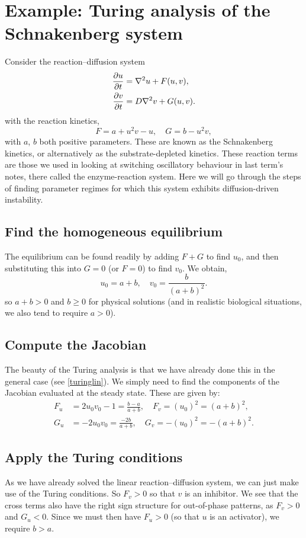 \documentclass[main.tex]{subfiles}
\begin{document}
\section{Example: Turing analysis of the Schnakenberg system}\label{Schnack_Sect}
Consider the reaction--diffusion system
    \begin{align}\label{RD_System_Schnack}
\pd{u}{t} &= \nabla^2u +  F(u,v),\\
\pd{v}{t} &= D\nabla^2v +  G(u,v).
\end{align}
with the reaction kinetics,
\begin{equation}
F = a+u^2v- u,\quad G = b- u^2v,
\end{equation}
with $a$, $b$ both positive parameters. These are known as the Schnakenberg kinetics, or alternatively as the substrate-depleted kinetics. These reaction terms are those we used in looking at switching oscillatory behaviour in last term's notes, there called the enzyme-reaction system. Here we will go through the steps of finding parameter regimes for which this system exhibits diffusion-driven instability.

\subsection*{Find the homogeneous equilibrium}
The equilibrium can be found readily by adding $F+G$ to find $u_0$, and then substituting this into $G=0$ (or $F=0$) to find $v_0$. We obtain,
\begin{equation}
u_0 = a+b,\quad v_0 = \frac{b}{(a+b)^2}.
\end{equation}
so $a+b> 0$ and $b\geq 0$ for physical solutions (and in realistic biological situations, we also tend to require $a>0$).

\subsection*{Compute the Jacobian}
The beauty of the Turing analysis is that we have already done this in the general case (see \cref{turinglin}). We simply need to find the components of the Jacobian evaluated at the steady state. These are given by:
\begin{align}
\label{enzymepds}
F_u &= 2u_0v_0-1=\frac{b-a}{a+b}, \quad F_v =(u_0)^2= (a+b)^2,\\ \nonumber G_u &=-2u_0 v_0= \frac{-2b}{a+b},\quad G_v = -(u_0)^2= -(a+b)^2.
\end{align}


\subsection*{Apply the Turing conditions}
As we have already solved the linear reaction--diffusion system, we can just make use of the Turing conditions. So $F_v>0$ so that $v$ is an inhibitor. We see that the cross terms also have the right sign structure for out-of-phase patterns, as $F_v>0$ and $G_u<0$. Since we must then have $F_u>0$ (so that $u$ is an activator), we require $b>a$.
\end{document}
